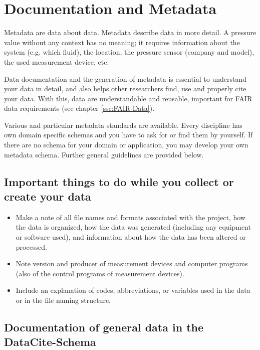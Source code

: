 \section{Documentation and Metadata}\label{ssc:Doku+Metadata}

Metadata are data about data. Metadata describe data in more detail. A pressure value without any context has no meaning; it requires information about the system (e.g. which fluid), the location, the pressure sensor (company and model), the used measurement device, etc.

Data documentation and the generation of metadata is essential to understand your data in detail, and also helps other researchers find, use and properly cite your data. With this, data are understandable and reusable, important for FAIR data requirements (see chapter \ref{ssc:FAIR-Data}).

Various and particular metadata standards are available. Every discipline has own domain specific schemas and you have to ask for or find them by yourself. If there are no schema for your domain or application, you may develop your own metadata schema. Further general guidelines are provided below.



\subsection{Important things to do while you collect or create your data}

\begin{itemize}
  \item Make a note of all file names and formats associated with the project,
        how the data is organized, how the data was generated (including any
        equipment or software used), and information about how the data has been
        altered or processed.
  \item Note version and producer of measurement devices and computer programs (also of the control programs of measurement devices).
  \item Include an explanation of codes, abbreviations, or variables used in the
        data or in the file naming structure.

\end{itemize}


\subsection{Documentation of general data in the DataCite-Schema}\label{sc:data-documentation}

